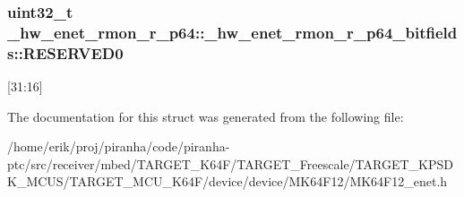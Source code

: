 \subsubsection[{\texorpdfstring{R\+E\+S\+E\+R\+V\+E\+D0}{RESERVED0}}]{\setlength{\rightskip}{0pt plus 5cm}uint32\+\_\+t \+\_\+hw\+\_\+enet\+\_\+rmon\+\_\+r\+\_\+p64\+::\+\_\+hw\+\_\+enet\+\_\+rmon\+\_\+r\+\_\+p64\+\_\+bitfields\+::\+R\+E\+S\+E\+R\+V\+E\+D0}\hypertarget{struct__hw__enet__rmon__r__p64_1_1__hw__enet__rmon__r__p64__bitfields_a3d5ab5ed267b972440b78b1c509665a0}{}\label{struct__hw__enet__rmon__r__p64_1_1__hw__enet__rmon__r__p64__bitfields_a3d5ab5ed267b972440b78b1c509665a0}
\mbox{[}31\+:16\mbox{]} 

The documentation for this struct was generated from the following file\+:\begin{DoxyCompactItemize}
\item 
/home/erik/proj/piranha/code/piranha-\/ptc/src/receiver/mbed/\+T\+A\+R\+G\+E\+T\+\_\+\+K64\+F/\+T\+A\+R\+G\+E\+T\+\_\+\+Freescale/\+T\+A\+R\+G\+E\+T\+\_\+\+K\+P\+S\+D\+K\+\_\+\+M\+C\+U\+S/\+T\+A\+R\+G\+E\+T\+\_\+\+M\+C\+U\+\_\+\+K64\+F/device/device/\+M\+K64\+F12/M\+K64\+F12\+\_\+enet.\+h\end{DoxyCompactItemize}
